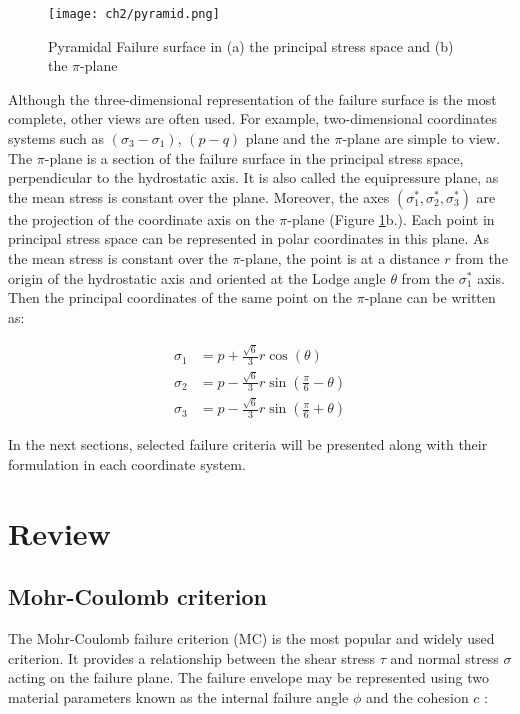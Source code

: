 \begin{figure}[tb]
    \centering
    \texttt{[image: ch2/pyramid.png]}
    \caption{Pyramidal Failure surface in (a) the principal stress space and (b) the $\pi$-plane \cite{Labuz2018}}
    \label{fig2:pyramid}
\end{figure}

Although the three-dimensional representation of the failure surface is the most complete, other views are often used. For example, two-dimensional coordinates systems such as $(\sigma_3 -\sigma_1)$, $(p-q)$ plane and the $\pi$-plane are simple to view. The $\pi$-plane is a section of the failure surface in the principal stress space, perpendicular to the hydrostatic axis. It is also called the equipressure plane, as the mean stress is constant over the plane. Moreover, the axes $(\sigma_1^*,\sigma_2^*,\sigma_3^*)$ are the projection of the coordinate axis on the $\pi$-plane (Figure \ref{fig2:pyramid}b.). Each point in principal stress space can be represented in polar coordinates in this plane. As the mean stress is constant over the $\pi$-plane, the point is at a distance $r$ from the origin of the hydrostatic axis and oriented at the Lodge angle $\theta$ from the  $\sigma_1^*$ axis. Then the principal coordinates of the same point on the $\pi$-plane can be written as: 

\begin{align}
    \sigma_1 &= p + \frac{\sqrt{6}}{3}r\cos\left(\theta\right) \label{eq2:sig1}\\
    \sigma_2 &= p - \frac{\sqrt{6}}{3}r\sin\left(\frac{\pi}{6}-\theta\right)\\
    \sigma_3 &= p - \frac{\sqrt{6}}{3}r\sin\left(\frac{\pi}{6}+\theta\right) \label{eq2:sig3}
\end{align}

In the next sections, selected failure criteria will be presented along with their formulation in each coordinate system. 

\section{Review}
\subsection{Mohr-Coulomb criterion}

The Mohr-Coulomb failure criterion (MC) is the most popular and widely used criterion. It provides a relationship between the shear stress $\tau$ and normal stress $\sigma$ acting on the failure plane. The failure envelope may be represented using two material parameters known as the internal failure angle $\phi$ and the cohesion $c$ :

